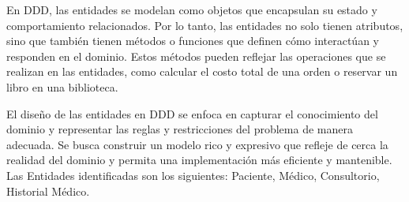 En DDD, las entidades se modelan como objetos que encapsulan su estado y comportamiento relacionados. Por lo tanto,
las entidades no solo tienen atributos, sino que también tienen métodos o funciones que definen cómo interactúan y
responden en el dominio. Estos métodos pueden reflejar las operaciones que se realizan en las entidades, como calcular
el costo total de una orden o reservar un libro en una biblioteca.

El diseño de las entidades en DDD se enfoca en capturar el conocimiento del dominio y representar las reglas y
restricciones del problema de manera adecuada. Se busca construir un modelo rico y expresivo que refleje de cerca
la realidad del dominio y permita una implementación más eficiente y mantenible.
Las Entidades identificadas son los siguientes: Paciente, Médico, Consultorio, Historial Médico.



